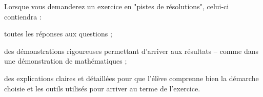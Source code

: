 Lorsque vous demanderez un exercice en "pistes de résolutions", celui-ci contiendra :
\item toutes les réponses aux questions ;
\item des démonstrations rigoureuses permettant d'arriver aux résultats -- comme dans une démonstration de mathématiques ;
\item des explications claires et détaillées pour que l'élève comprenne bien la démarche choisie et les outils utilisés pour arriver au terme de l'exercice.